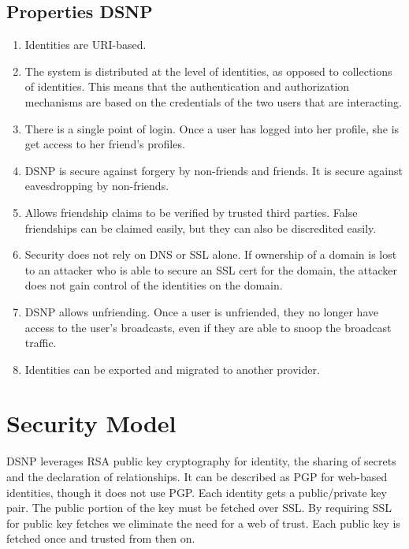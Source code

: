 \documentclass[letterpaper,11pt,oneside]{article}
\begin{document}
\subsection{Properties DSNP}

\begin{enumerate}

\item Identities are URI-based.

\item The system is distributed at the level of identities, as opposed to collections
of identities. This means that the authentication and authorization mechanisms
are based on the credentials of the two users that are interacting.

\item There is a single point of login. Once a user has logged into her profile, she is get access to her friend's profiles.

\item DSNP is secure against forgery by non-friends and friends. It is secure against
eavesdropping by non-friends.

\item Allows friendship claims to be verified by trusted third parties. False
friendships can be claimed easily, but they can also be discredited easily.

\item Security does not rely on DNS or SSL alone. If ownership of a domain is lost to
an attacker who is able to secure an SSL cert for the domain, the attacker does
not gain control of the identities on the domain.

\item DSNP allows unfriending. Once a user is unfriended, they no longer have access
to the user's broadcasts, even if they are able to snoop the broadcast traffic.

\item Identities can be exported and migrated to another provider.

\end{enumerate}

\section{Security Model}

DSNP leverages RSA public key cryptography for identity, the sharing of secrets
and the declaration of relationships. It can be described as PGP for web-based
identities, though it does not use PGP. Each identity gets a public/private key
pair. The public portion of the key must be fetched over SSL. By requiring SSL
for public key fetches we eliminate the need for a web of trust. Each public
key is fetched once and trusted from then on.
\end{document}
